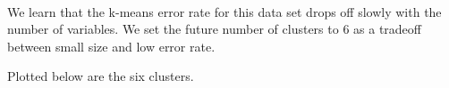 \documentclass{article} %
\begin{document}
    \begin{center}
    \end{center}
    { \hspace*{\fill} \\}

We learn that the k-means error rate for this data set drops off slowly with the number of variables. We set the future number of clusters to 6 as a tradeoff between small size and low error rate.

Plotted below are the six clusters.

    \begin{center}
    \end{center}
    { \hspace*{\fill} \\}

    \begin{center}
    \end{center}
    { \hspace*{\fill} \\}

    \begin{center}
    \end{center}
    { \hspace*{\fill} \\}

    \begin{center}
    \end{center}
    { \hspace*{\fill} \\}

    \begin{center}
    \end{center}
    { \hspace*{\fill} \\}

    \begin{center}
    \end{center}
    { \hspace*{\fill} \\}
\end{document}
